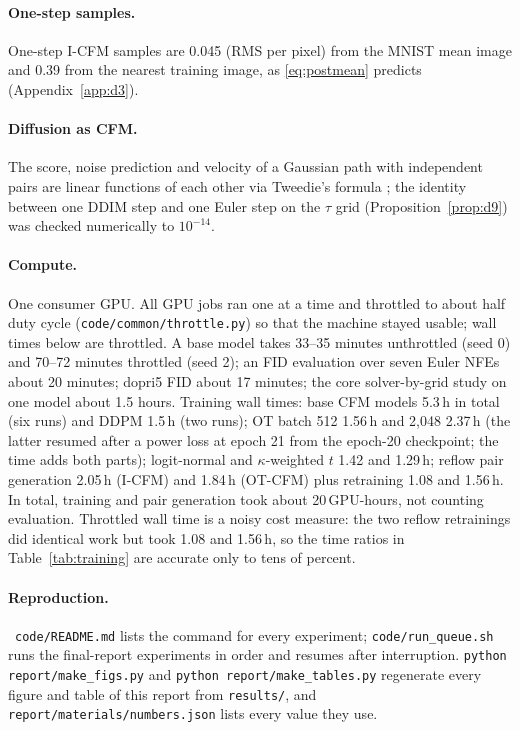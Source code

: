 \paragraph{One-step samples.} One-step I-CFM samples are 0.045 (RMS per pixel) from the MNIST mean image and 0.39 from the nearest training image, as \eqref{eq:postmean} predicts (Appendix~\ref{app:d3}). %
\paragraph{Diffusion as CFM.} The score, noise prediction and velocity of a Gaussian path with independent pairs are linear functions of each other via Tweedie's formula \citep{efron2011tweedie}; the identity between one DDIM step and one Euler step on the $\tau$ grid (Proposition~\ref{prop:d9}) was checked numerically to $10^{-14}$.
\paragraph{Compute.} One consumer GPU. All GPU jobs ran one at a time and throttled to about half duty cycle (\texttt{code/common/throttle.py}) so that the machine stayed usable; wall times below are throttled. A base model takes 33--35 minutes unthrottled (seed 0) and 70--72 minutes throttled (seed 2); an FID evaluation over seven Euler NFEs about 20 minutes; dopri5 FID about 17 minutes; the core solver-by-grid study on one model about 1.5 hours. Training wall times: base CFM models 5.3\,h in total (six runs) and DDPM 1.5\,h (two runs); OT batch 512 1.56\,h and 2,048 2.37\,h (the latter resumed after a power loss at epoch 21 from the epoch-20 checkpoint; the time adds both parts); logit-normal and $\kappa$-weighted $t$ 1.42 and 1.29\,h; reflow pair generation 2.05\,h (I-CFM) and 1.84\,h (OT-CFM) plus retraining 1.08 and 1.56\,h. In total, training and pair generation took about 20\,GPU-hours, not counting evaluation. Throttled wall time is a noisy cost measure: the two reflow retrainings did identical work but took 1.08 and 1.56\,h, so the time ratios in Table~\ref{tab:training} are accurate only to tens of percent. %
\paragraph{Reproduction.}\sloppy\ \texttt{code/README.md} lists the command for every experiment; \texttt{code/run\_queue.sh} runs the final-report experiments in order and resumes after interruption. \texttt{python report/make\_figs.py} and \texttt{python report/make\_tables.py} regenerate every figure and table of this report from \texttt{results/}, and \texttt{report/materials/numbers.json} lists every value they use.
